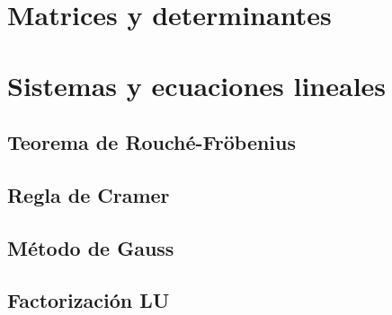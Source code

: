 \section{Matrices y determinantes}

\section{Sistemas y ecuaciones lineales}
\subsection{Teorema de Rouché-Fröbenius}
\subsection{Regla de Cramer}
\subsection{Método de Gauss}
\subsection{Factorización LU}

